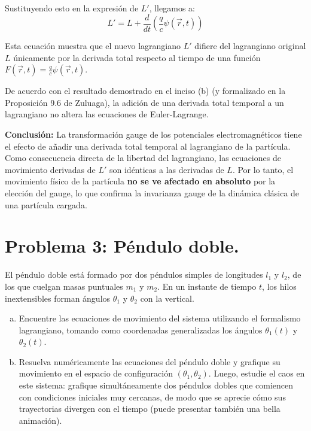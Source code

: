 \documentclass[a4paper]{article}
\begin{document}
Sustituyendo esto en la expresión de $L'$, llegamos a:
$$L' = L + \frac{d}{dt}\left( \frac{q}{c}\psi(\vec{r}, t) \right)$$

Esta ecuación muestra que el nuevo lagrangiano $L'$ difiere del lagrangiano original $L$ únicamente por la derivada total respecto al tiempo de una función $F(\vec{r}, t) = \frac{q}{c}\psi(\vec{r}, t)$. 

De acuerdo con el resultado demostrado en el inciso (b) (y formalizado en la Proposición 9.6 de Zuluaga), la adición de una derivada total temporal a un lagrangiano no altera las ecuaciones de Euler-Lagrange. 

\textbf{Conclusión:} La transformación gauge de los potenciales electromagnéticos tiene el efecto de añadir una derivada total temporal al lagrangiano de la partícula. Como consecuencia directa de la libertad del lagrangiano, las ecuaciones de movimiento derivadas de $L'$ son idénticas a las derivadas de $L$. Por lo tanto, el movimiento físico de la partícula \textbf{no se ve afectado en absoluto} por la elección del gauge, lo que confirma la invarianza gauge de la dinámica clásica de una partícula cargada.

\section{Problema 3: Péndulo doble.}

El péndulo doble está formado por dos péndulos simples de longitudes $l_1$ y $l_2$, de los que cuelgan masas puntuales $m_1$ y $m_2$. En un instante de tiempo $t$, los hilos inextensibles forman ángulos $\theta_1$ y $\theta_2$ con la vertical.

\begin{enumerate}[a)]
    \item Encuentre las ecuaciones de movimiento del sistema utilizando el formalismo lagrangiano, tomando como coordenadas generalizadas los ángulos $\theta_1(t)$ y $\theta_2(t)$.
    
    \item Resuelva numéricamente las ecuaciones del péndulo doble y grafique su movimiento en el espacio de configuración $(\theta_1, \theta_2)$. Luego, estudie el caos en este sistema: grafique simultáneamente dos péndulos dobles que comiencen con condiciones iniciales muy cercanas, de modo que se aprecie cómo sus trayectorias divergen con el tiempo (puede presentar también una bella animación).
\end{enumerate}
\end{document}
